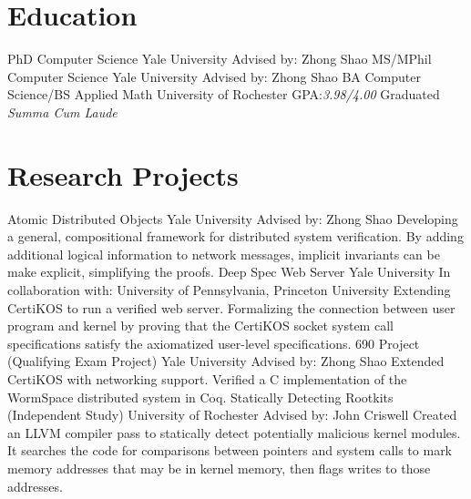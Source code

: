 \documentclass[10pt,letterpaper,sans]{moderncv}
\begin{document}
\renewcommand*{\namefont}{\fontsize{20}{24}\mdseries\upshape}
\makecvtitle{}
\vspace{-1cm}

\section{Education}

        {PhD Computer Science}
        {Yale University}
        {}
        {}
        {Advised by: Zhong Shao}
        {MS/MPhil Computer Science}
        {Yale University}
        {}
        {}
        {Advised by: Zhong Shao}
        {BA Computer Science/BS Applied Math}
        {University of Rochester}
        {}
        {GPA:\@ \textit{3.98/4.00}}
        {Graduated \textit{Summa Cum Laude}}

\section{Research Projects}

        {Atomic Distributed Objects}
        {Yale University}
        {Advised by: Zhong Shao}
        {}
        {Developing a general, compositional framework for distributed system
        verification.
        By adding additional logical information to network messages, implicit
        invariants can be make explicit, simplifying the proofs.}
        {Deep Spec Web Server}
        {Yale University}
        {In collaboration with: University of Pennsylvania, Princeton University}
        {}
        {Extending CertiKOS to run a verified web server.
         Formalizing the connection between user program and kernel by proving
         that the CertiKOS socket system call specifications satisfy the
         axiomatized user-level specifications.}
        {690 Project (Qualifying Exam Project)}
        {Yale University}
        {Advised by: Zhong Shao}
        {}
        {Extended CertiKOS with networking support.
         Verified a C implementation of the WormSpace distributed system in Coq.}
        {Statically Detecting Rootkits (Independent Study)}
        {University of Rochester}
        {Advised by: John Criswell}
        {}
        {Created an LLVM compiler pass to statically detect potentially
         malicious kernel modules.
         It searches the code for comparisons between pointers and system calls
         to mark memory addresses that may be in kernel memory, then flags
         writes to those addresses.}
\end{document}

